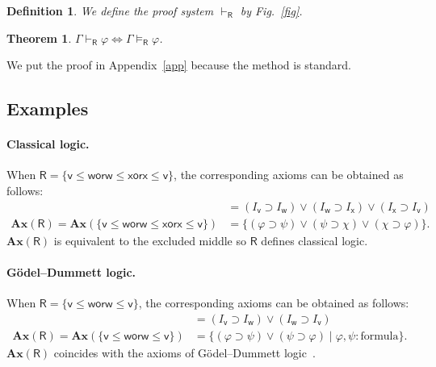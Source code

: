 \documentclass[doctor]{iscs-thesis}
\newcommand{\vdashR}{\vdash_{\mathsf R}}
\newcommand{\modelsR}{\models_{\mathsf R}}
\newtheorem{definition}{Definition}
\newtheorem{theorem}{Theorem}
\newcommand{\wor}{\mathsf{{or}}}
\begin{document}
\begin{definition}
 We define the proof system $\vdashR$ by Fig.~\ref{fig}.
\end{definition}

\begin{theorem}
 \label{sound-comp-nat-kripke}
 $\Gamma\vdashR\varphi\Longleftrightarrow\Gamma\modelsR \varphi$\enspace.
\end{theorem}
We put the proof in Appendix~\ref{app} because the method is
standard.

\subsection{Examples}

\paragraph{Classical logic.}
When
$\mathsf R = \{\mathsf v\le\mathsf w\wor\mathsf w\le\mathsf x\wor\mathsf x\le\mathsf
v\}$,
the corresponding axioms can be obtained as follows:
\begin{align*}
[ \mathsf v\le \mathsf w\wor \mathsf w\le\mathsf x\wor \mathsf x\le\mathsf v ] &=
(I_{\mathsf v}\supset I_{\mathsf w})\vee (I_{\mathsf w}\supset
I_{\mathsf x})\vee (I_{\mathsf x}\supset I_{\mathsf v})
\\
\mathbf{Ax}(\mathsf R) = \mathbf{Ax}(\{\mathsf v\le\mathsf w\wor \mathsf
w\le \mathsf x \wor \mathsf x\le\mathsf v\}) &= \{(\varphi\supset\psi)\vee(\psi\supset\chi)\vee(\chi\supset\varphi)\}.
\end{align*}
$\mathbf{Ax}(\mathsf R)$ is equivalent to the excluded middle so $\mathsf R$ defines
classical logic.

\paragraph{G\"{o}del--Dummett logic.}
When $\mathsf R=\{\mathsf v\le\mathsf w\wor\mathsf w\le\mathsf v\}$,
the corresponding axioms can be obtained as follows:
\begin{align*}
[\mathsf v\le \mathsf w\wor \mathsf w\le\mathsf v] &=
(I_{\mathsf v}\supset I_{\mathsf w})\vee (I_{\mathsf w}\supset
I_{\mathsf v})\\
\mathbf{Ax}(\mathsf R) = \mathbf{Ax}(\{\mathsf v\le\mathsf w\wor \mathsf
w\le \mathsf v\}) &= \{(\varphi\supset\psi)\vee(\psi\supset\varphi)\mid
\varphi,\psi\colon\mbox{formula}\}.
\end{align*}
$\mathbf{Ax}(\mathsf R)$ coincides with the axioms of
G\"{o}del--Dummett logic~\cite{dummett59}.
\end{document}
